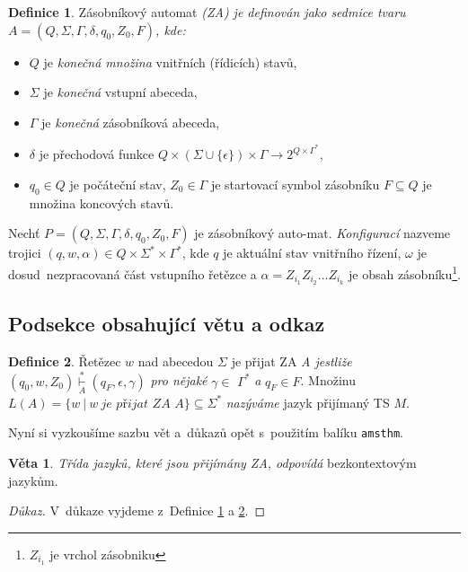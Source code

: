 \documentclass[11pt, a4paper, twocolumn ]{article}
\theoremstyle{definition}
\newtheorem{definition}{Definice}
\newtheorem{mysnt}{Věta}
\begin{document}
\begin{definition}
    \label{definition_zasobnikovy_automat}
    Zásobníkový automat \emph{(ZA) je definován jako sedmice tvaru $A = (Q,\Sigma,\Gamma,\delta,q_0,Z_0,F)$, kde:}

\begin{itemize}
    \item $Q$ je \emph{konečná množina} vnitřních (řídicích) stavů,
    \item $\Sigma$ je \emph{konečná} vstupní abeceda,
    \item $\Gamma$ je \emph{konečná} zásobníková abeceda,
    \item $\delta$ je přechodová funkce $Q \times (\Sigma \cup \{{\epsilon}\}) \times \Gamma \rightarrow 2^{Q\times\Gamma^*}$,
    \item $q_0 \in Q$ je počáteční stav, $Z_0 \in \Gamma$ je startovací symbol zásobníku $F \subseteq Q$ je množina koncových stavů.
\end{itemize}
\smallskip
\par
Nechť $P = (Q, \Sigma, \Gamma, \delta, q_0, Z_0, F)$ je zásobníkový auto-mat. \emph{Konfigurací} nazveme trojici $(q, w, \alpha) \in Q \times \Sigma^{*} \times \Gamma^{*}$, kde $q$ je aktuální stav vnitřního řízení, $\omega$ je dosud~nezpracovaná část vstupního řetězce a $\alpha = Z_{i_1} Z_{i_2} \dots Z_{i_k}$ je obsah zásobníku\footnote{$Z_{i_1}$ je vrchol zásobniku}.
\end{definition} 

\subsection{Podsekce obsahující větu a odkaz}
\begin{definition}
    \label{definition_retazec}
    Řetězec $w$ nad abecedou $\Sigma$ je přijat ZA \emph{A jestliže} $(q_0, w, Z_0)\underset{A}{\overset{*}{\vdash}}(q_F, \epsilon, \gamma)$ \textit{pro nějaké} $ \gamma \in$ $\Gamma^*$ \emph{a} $q_F \in F$. 
    Množinu $L(A) = \{w\: |\: w\: \textit{je přijat ZA A}\} \subseteq \Sigma^*$ \emph{nazýváme} jazyk přijímaný TS $M$.\par \medskip
    Nyní si vyzkoušíme sazbu vět a~důkazů opět s~použitím balíku \texttt{amsthm}. \par

\end{definition}

\begin{mysnt}
    \label{snt}
    \emph {Třída jazyků, které jsou přijímány ZA, odpovídá}
    bezkontextovým jazykům.

    \begin{proof}[Důkaz]
      V~důkaze vyjdeme z~Definice \ref{definition_zasobnikovy_automat} a \ref{definition_retazec}.
    \end{proof}
\end{mysnt}
\end{document}
